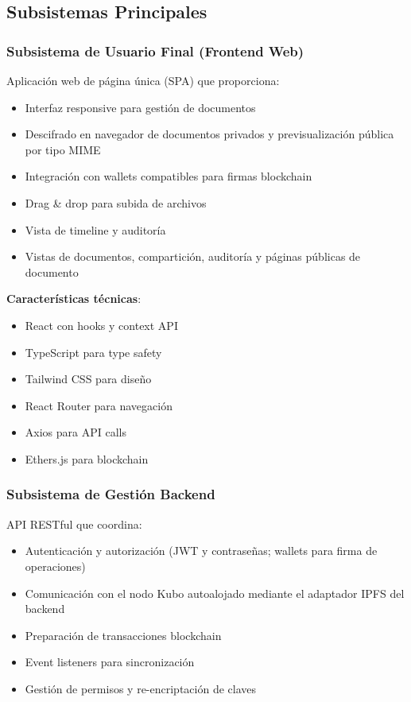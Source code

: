 \documentclass[11pt, a4paper]{article}
\begin{document}
\subsection{Subsistemas Principales}

\subsubsection{Subsistema de Usuario Final (Frontend Web)}

Aplicación web de página única (SPA) que proporciona:

\begin{itemize}
    \item Interfaz responsive para gestión de documentos
    \item Descifrado en navegador de documentos privados y previsualización pública por tipo MIME
    \item Integración con wallets compatibles para firmas blockchain
    \item Drag \& drop para subida de archivos
    \item Vista de timeline y auditoría
    \item Vistas de documentos, compartición, auditoría y páginas públicas de documento
\end{itemize}

\textbf{Características técnicas}:
\begin{itemize}
    \item React con hooks y context API
    \item TypeScript para type safety
    \item Tailwind CSS para diseño
    \item React Router para navegación
    \item Axios para API calls
    \item Ethers.js para blockchain
\end{itemize}

\subsubsection{Subsistema de Gestión Backend}

API RESTful que coordina:

\begin{itemize}
    \item Autenticación y autorización (JWT y contraseñas; wallets para firma de operaciones)
    \item Comunicación con el nodo Kubo autoalojado mediante el adaptador IPFS del backend
    \item Preparación de transacciones blockchain
    \item Event listeners para sincronización
    \item Gestión de permisos y re-encriptación de claves
\end{itemize}
\end{document}
